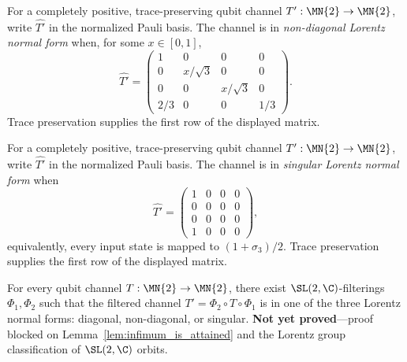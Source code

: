 \begin{definition}\label{def:lorentz_non_diagonal}
    For a completely positive, trace-preserving qubit channel
    $T' : \MN{2} \to \MN{2}$, write $\widehat{T'}$ in the normalized
    Pauli basis. The channel is in \emph{non-diagonal Lorentz normal form}
    when, for some $x \in [0,1]$,
    \[
        \widehat{T'} =
        \begin{pmatrix}
            1   &0          &0          &0\\
            0   &x/\sqrt{3} &0          &0\\
            0   &0          &x/\sqrt{3} &0\\
            2/3 &0          &0          &1/3
        \end{pmatrix}.
    \]
    Trace preservation supplies the first row of the displayed matrix.
\end{definition}

\begin{definition}\label{def:lorentz_singular}
    For a completely positive, trace-preserving qubit channel
    $T' : \MN{2} \to \MN{2}$, write $\widehat{T'}$ in the normalized
    Pauli basis. The channel is in \emph{singular Lorentz normal form} when
    \[
        \widehat{T'} =
        \begin{pmatrix}
            1 &0 &0 &0\\
            0 &0 &0 &0\\
            0 &0 &0 &0\\
            1 &0 &0 &0
        \end{pmatrix},
    \]
    equivalently, every input state is mapped to $(1+\sigma_{3})/2$.
    Trace preservation supplies the first row of the displayed matrix.
\end{definition}

\begin{theorem}\label{thm:lorentz_normal_form_qubit}
    For every qubit channel $T : \MN{2} \to \MN{2}$,
    there exist $\SL(2, \C)$-filterings $\Phi_{1}, \Phi_{2}$ such that
    the filtered channel $T' = \Phi_{2} \circ T \circ \Phi_{1}$ is in one of
    the three Lorentz normal forms: diagonal, non-diagonal, or singular.
    \textbf{Not yet proved}---proof blocked on
    Lemma~\ref{lem:infimum_is_attained} and the Lorentz group classification
    of $\SL(2, \C)$ orbits.
\end{theorem}


